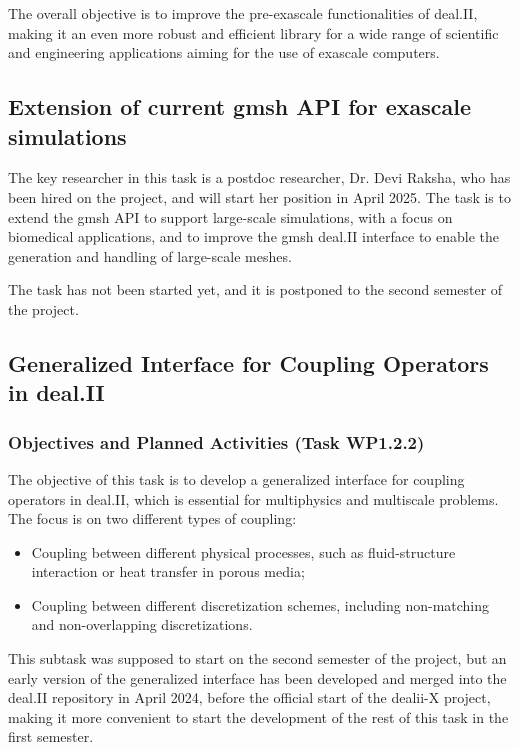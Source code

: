 \documentclass[a4paper,12pt]{article}
\begin{document}
The overall objective is to improve the pre-exascale functionalities of deal.II,
making it an even more robust and efficient library for a wide range of
scientific and engineering applications aiming for the use of exascale
computers.

\subsection{Extension of current gmsh API for exascale simulations}
    The key researcher in this task is a postdoc researcher, Dr. Devi Raksha, who
    has been hired on the project, and will start her position in April 2025.
    The task is to extend the gmsh API to support large-scale simulations, with
    a focus on biomedical applications, and to improve the gmsh deal.II
    interface to enable the generation and handling of large-scale meshes.

    The task has not been started yet, and it is postponed to the second
    semester of the project.

\subsection{Generalized Interface for Coupling Operators in deal.II}
    \subsubsection{Objectives and Planned Activities (Task WP1.2.2)}

    The objective of this task is to develop a generalized interface for
    coupling operators in deal.II, which is essential for multiphysics and
    multiscale problems. The focus is on two different types of coupling:
    \begin{itemize}
        \item Coupling between different physical processes, such as fluid-structure interaction or heat transfer in porous media;
        \item Coupling between different discretization schemes, including
        non-matching and non-overlapping discretizations.
    \end{itemize}

    This subtask was supposed to start on the second semester of the project,
    but an early version of the generalized interface has been developed and
    merged into the deal.II repository in April 2024, before the official start
    of the dealii-X project, making it more convenient to start the development
    of the rest of this task in the first semester.
\end{document}
